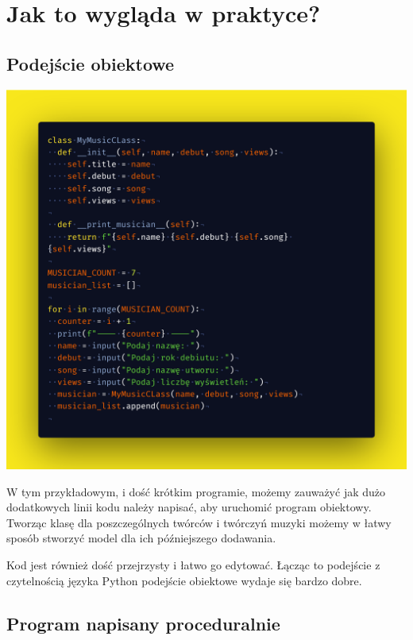 \newpage

\section{Jak to wygląda w praktyce?}

\subsection{Podejście obiektowe}

\includegraphics[width=\textwidth]{images/object-oriented-python.png}

\begin{flushleft}
    W tym przykładowym, i dość krótkim programie, możemy zauważyć jak dużo dodatkowych linii kodu należy napisać, aby uruchomić program obiektowy. Tworząc klasę dla poszczególnych twórców i twórczyń muzyki możemy w łatwy sposób stworzyć model dla ich późniejszego dodawania.
\end{flushleft} 

\begin{flushleft}
    Kod jest również dość przejrzysty i łatwo go edytować. Łącząc to podejście z czytelnością języka Python podejście obiektowe wydaje się bardzo dobre.
\end{flushleft}

\subsection{Program napisany proceduralnie}

